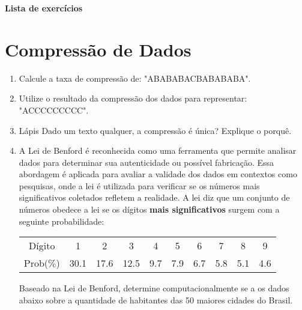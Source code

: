 \documentclass[12pt]{article}
\begin{document}
\begin{center}
    \LARGE \textbf{Lista de exercícios}
\end{center}
\section{Compressão de Dados}
\begin{enumerate}[label=\textbf{Q\arabic*}]
    \item Calcule a taxa de compressão de: "ABABABACBABABABA".
    \item Utilize o resultado da compressão dos dados para representar: "ACCCCCCCCC".
    \item Lápis Dado um texto qualquer, a compressão é única? Explique o porquê.
    \item \faLaptop A Lei de Benford é reconhecida como uma ferramenta que permite analisar dados para determinar sua autenticidade ou possível fabricação. Essa abordagem é aplicada para avaliar a validade dos dados em contextos como pesquisas, onde a lei é utilizada para verificar se os números mais significativos coletados refletem a realidade. A lei diz que um conjunto de números obedece a lei se os dígitos \textbf{mais significativos} surgem com a seguinte probabilidade:
          \begin{center}

              \begin{tabular}{c|ccccccccc}
                  \hline
                  Dígito     & 1    & 2    & 3    & 4   & 5   & 6   & 7   & 8   & 9   \\
                  Prob($\%$) & 30.1 & 17.6 & 12.5 & 9.7 & 7.9 & 6.7 & 5.8 & 5.1 & 4.6 \\
                  \hline
              \end{tabular}
          \end{center}
          Baseado na Lei de Benford, determine computacionalmente se a os dados abaixo sobre a quantidade de habitantes das 50 maiores cidades do Brasil.

          \begin{minipage}{0.50\textwidth}


\end{minipage}
\end{enumerate}
\end{document}

